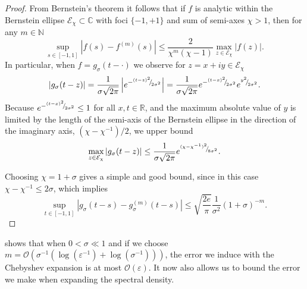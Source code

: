 \documentclass[12pt]{article}
\begin{document}
\begin{proof}
    From Bernstein's theorem \cite[theorem 4.3]{trefethen-2008-gauss-quadrature} it follows that if $f$ is analytic within the Bernstein ellipse $\mathcal{E}_{\chi} \subset \mathbb{C}$ with foci $\{-1, +1\}$ and sum of semi-axes $\chi > 1$, then for any $m \in \mathbb{N}$
    \begin{equation}
        \sup_{s \in [-1, 1]} \left| f(s) - f^{(m)}(s) \right| \leq \frac{2}{\chi^m (\chi - 1)} \max_{z \in \mathcal{E}_{\chi}} |f(z)|.
        \label{equ:bernstein-bound}
    \end{equation}
    In particular, when $f = g_{\sigma}(t - \cdot)$ we observe for $z = x + iy \in \mathcal{E}_{\chi}$
    \begin{equation}
    | g_{\sigma}(t - z) | 
    = \frac{1}{\sigma \sqrt{2 \pi}} \left| e^{-{}^{(t - z)^2}{\mskip -5mu/\mskip -3mu}_{2\sigma^2}} \right|
    = \frac{1}{\sigma \sqrt{2 \pi}} e^{-{}^{(t - x)^2}{\mskip -5mu/\mskip -3mu}_{2\sigma^2}}e^{{}^{y^2}{\mskip -5mu/\mskip -3mu}_{2\sigma^2}}.
    \end{equation}
    Because $e^{-{}^{(t - x)^2}{\mskip -5mu/\mskip -3mu}_{2\sigma^2}} \leq 1$ for all $x, t \in \mathbb{R}$, and the maximum absolute value of $y$ is limited by the length of the semi-axis of the Bernstein ellipse in the direction of the imaginary axis, $(\chi - \chi^{-1}) / 2$, we upper bound
    \begin{equation}
        \max_{z \in \mathcal{E}_{\chi}} | g_{\sigma}(t - z) | 
        \leq \frac{1}{\sigma \sqrt{2 \pi}} e^{{}^{(\chi - \chi^{-1})^2}{\mskip -5mu/\mskip -3mu}_{8 \sigma^2}}.
    \end{equation}

    Choosing $\chi = 1 + \sigma$ gives a simple and good bound, since in this case $\chi - \chi^{-1} \leq 2\sigma$, which implies
    \begin{equation}
        \sup_{t \in [-1, 1]} \left| g_{\sigma}(t - s) - g_{\sigma}^{(m)}(t - s) \right| \leq \sqrt{\frac{2e}{\pi}} \frac{1}{\sigma^2} (1 + \sigma)^{-m}.
    \end{equation}
\end{proof}

 shows that when $0 < \sigma \ll 1$ and if we choose $m = \mathcal{O}(\sigma^{-1}(\log(\varepsilon^{-1}) + \log(\sigma^{-1})))$, the error we induce with the Chebyshev expansion is at most $\mathcal{O}(\varepsilon)$. It now also allows us to bound the error we make when expanding the spectral density.
\end{document}
